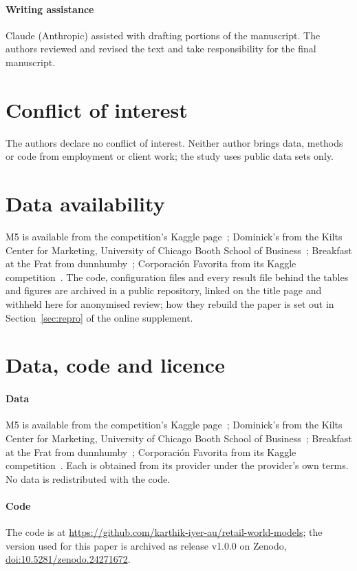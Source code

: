 \paragraph{Writing assistance} Claude (Anthropic) assisted with drafting portions
of the manuscript. The authors reviewed and revised the text and take
responsibility for the final manuscript.

\section{Conflict of interest}
The authors declare no conflict of interest. Neither author brings data, methods
or code from employment or client work; the study uses public data sets only.

\else\ifjournal
\section{Data availability}
\label{sec:licence}
M5 is available from the competition's Kaggle page~\cite{m5accuracy};
Dominick's from the Kilts Center for Marketing, University of Chicago Booth
School of Business~\cite{dominicks}; Breakfast at the Frat from
dunnhumby~\cite{frat}; Corporaci\'on Favorita from its Kaggle
competition~\cite{favorita}. The code, configuration files and every result file
behind the tables and figures are archived in a public repository, linked on the
title page and withheld here for anonymised review; how they rebuild the paper is
set out in Section~\ref{sec:repro} of the online supplement.

\else
\section{Data, code and licence}
\label{sec:licence}

\paragraph{Data}
M5 is available from the competition's Kaggle page~\cite{m5accuracy};
Dominick's from the Kilts Center for Marketing, University of Chicago Booth
School of Business~\cite{dominicks}; Breakfast at the Frat from
dunnhumby~\cite{frat}; Corporaci\'on Favorita from its Kaggle
competition~\cite{favorita}. Each is obtained from its provider under the
provider's own terms. No data is redistributed with the code.

\paragraph{Code}
The code is at
\url{https://github.com/karthik-iyer-au/retail-world-models}; the version used
for this paper is archived as release v1.0.0 on Zenodo,
\href{https://doi.org/10.5281/zenodo.24271672}{doi:10.5281/zenodo.24271672}.

